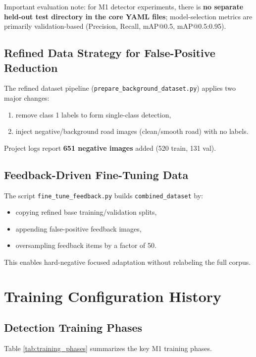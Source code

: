 \documentclass[twocolumn]{article}
\begin{document}
Important evaluation note: for M1 detector experiments, there is \textbf{no separate held-out test directory in the core YAML files}; model-selection metrics are primarily validation-based (Precision, Recall, mAP@0.5, mAP@0.5:0.95).

\subsection{Refined Data Strategy for False-Positive Reduction}
The refined dataset pipeline (\texttt{prepare\_background\_dataset.py}) applies two major changes:
\begin{enumerate}
    \item remove class 1 labels to form single-class detection,
    \item inject negative/background road images (clean/smooth road) with no labels.
\end{enumerate}

Project logs report \textbf{651 negative images} added (520 train, 131 val).

\subsection{Feedback-Driven Fine-Tuning Data}
The script \texttt{fine\_tune\_feedback.py} builds \texttt{combined\_dataset} by:
\begin{itemize}
    \item copying refined base training/validation splits,
    \item appending false-positive feedback images,
    \item oversampling feedback items by a factor of 50.
\end{itemize}
This enables hard-negative focused adaptation without relabeling the full corpus.

\section{Training Configuration History}
\subsection{Detection Training Phases}
Table \ref{tab:training_phases} summarizes the key M1 training phases.
\end{document}
